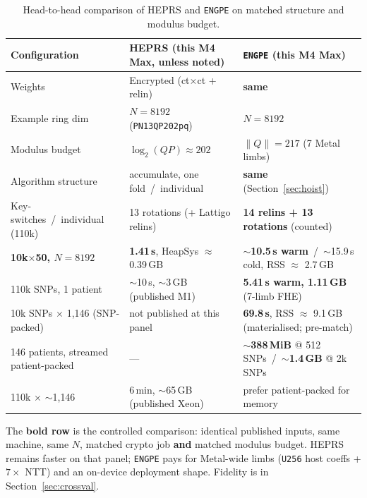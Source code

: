 \documentclass[11pt,a4paper]{article}
\newcommand{\engpe}{\texttt{ENGPE}}
\DeclareRobustCommand{\code}[1]{\texttt{#1}}
\begin{document}
\begin{table}[ht]
\centering
\caption{Head-to-head comparison of HEPRS and \engpe{} on matched structure and
  modulus budget.}
\label{tab:heprs}
\footnotesize
\setlength{\tabcolsep}{3.5pt}
\begin{tabularx}{\textwidth}{@{}>{\raggedright\arraybackslash}p{3.1cm}XX@{}}
\toprule
Configuration & HEPRS (this M4 Max, unless noted) & \engpe{} (this M4 Max) \\
\midrule
Weights
  & Encrypted (ct$\times$ct + relin)
  & \textbf{same} \\
Example ring dim
  & $N{=}8192$ (\code{PN13QP202pq})
  & $N{=}8192$ \\
Modulus budget
  & $\log_2(QP)\approx 202$
  & $\|Q\| = 217$ (7 Metal limbs) \\
Algorithm structure
  & accumulate, one fold~/~individual
  & \textbf{same} (Section~\ref{sec:hoist}) \\
Key-switches~/~individual (110k)
  & 13 rotations (+ Lattigo relins)
  & \textbf{14 relins + 13 rotations} (counted) \\
\textbf{10k$\times$50, $N{=}8192$}
  & \textbf{1.41\,s}, HeapSys $\approx$ 0.39\,GB
  & \textbf{$\sim$10.5\,s warm}~/~$\sim$15.9\,s cold, RSS $\approx$ 2.7\,GB \\
110k SNPs, 1 patient
  & $\sim$10\,s, $\sim$3\,GB (published M1)
  & \textbf{5.41\,s warm, 1.11\,GB} (7-limb FHE) \\
10k SNPs $\times$ 1{,}146 (SNP-packed)
  & not published at this panel
  & \textbf{69.8\,s}, RSS $\approx$ 9.1\,GB (materialised; pre-match) \\
1{,}146 patients, streamed patient-packed
  & ---
  & \textbf{$\sim$388\,MiB} @ 512 SNPs~/~\textbf{$\sim$1.4\,GB} @ 2k SNPs \\
110k $\times$ $\sim$1{,}146
  & 6\,min, $\sim$65\,GB (published Xeon)
  & prefer patient-packed for memory \\
\bottomrule
\end{tabularx}
\end{table}

The \textbf{bold row} is the controlled comparison: identical published inputs,
same machine, same $N$, matched crypto job \textbf{and} matched modulus budget.
HEPRS remains faster on that panel; \engpe{} pays for Metal-wide limbs
(\code{U256} host coeffs + $7\times$ NTT) and an on-device deployment shape.
Fidelity is in Section~\ref{sec:crossval}.

\end{document}
